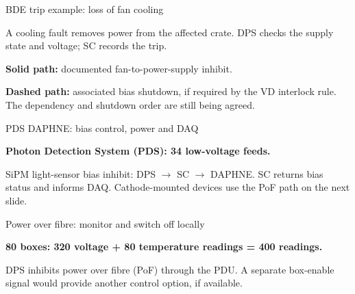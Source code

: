 \documentclass[aspectratio=169,11pt]{beamer}
\begin{document}
\begin{frame}{BDE trip example: loss of fan cooling}
\centering
{}\par\bigskip
\raggedright

A cooling fault removes power from the affected crate. DPS checks the supply state and voltage; SC records the trip.\par\bigskip
\textbf{Solid path:} documented fan-to-power-supply inhibit.\par\medskip
\textbf{Dashed path:} associated bias shutdown, if required by the VD interlock rule. The dependency and shutdown order are still being agreed.
\end{frame}

\begin{frame}{PDS DAPHNE: bias control, power and DAQ}
\centering

\par\bigskip
\raggedright

\textbf{Photon Detection System (PDS): 34 low-voltage feeds.}\par\medskip
SiPM light-sensor bias inhibit: DPS $\rightarrow$ SC $\rightarrow$ DAPHNE. SC returns bias status and informs DAQ. Cathode-mounted devices use the PoF path on the next slide.
\end{frame}

\begin{frame}{Power over fibre: monitor and switch off locally}
\centering

\par\bigskip
\raggedright

\textbf{80 boxes: 320 voltage + 80 temperature readings = 400 readings.}\par\medskip
DPS inhibits power over fibre (PoF) through the PDU. A separate box-enable signal would provide another control option, if available.
\end{frame}
\end{document}
